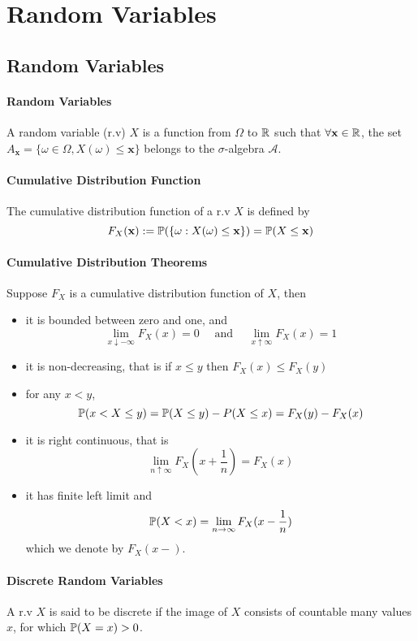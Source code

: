\section{Random Variables}
\subsection{Random Variables}
\paragraph{Random Variables}
A random variable (r.v) \(X\) is a function from \(\Omega\) to \(\mathbb{R}\) such that \(\forall \mathbf{x} \in \mathbb{R}\), the set \(A_{\mathbf{x}} = \{\omega \in \Omega, X(\omega) \leq \mathbf{x}\}\) belongs to the \(\sigma\)-algebra \(\mathcal{A}\).

\paragraph{Cumulative Distribution Function}
The cumulative distribution function of a r.v \(X\) is defined by
\[F_X(\mathbf{x}) := \mathbb{P}(\{\omega: X(\omega) \leq \mathbf{x} \}) = \mathbb{P}(X \leq \mathbf{x})\]

\paragraph{Cumulative Distribution Theorems}
Suppose \(F_X\) is a cumulative distribution function of \(X\), then
\begin{itemize}
    \item it is bounded between zero and one, and 
    \[\lim_{x \downarrow -\infty} F_X(x) = 0 \quad \text{ and } \quad \lim_{x \uparrow \infty} F_X(x) = 1\]
    \item it is non-decreasing, that is if \(x \leq y\) then \(F_X(x) \leq F_X(y)\)
    \item for any \(x < y\),
    \[\mathbb{P}(x < X \leq y) = \mathbb{P}(X \leq y) - P(X \leq x) = F_X(y) - F_X(x)\]
    \item it is right continuous, that is 
    \[\lim_{n \uparrow \infty} F_X(x + \frac{1}{n}) = F_X(x)\]
    \item it has finite left limit and 
    \[\mathbb{P}(X < x) = \lim_{n \to \infty} F_X(x - \frac{1}{n})\]
    which we denote by \(F_X(x-)\).
\end{itemize}

\paragraph{Discrete Random Variables}
A r.v \(X\) is said to be discrete if the image of \(X\) consists of countable many values \(x\), for which \(\mathbb{P}(X = x) > 0\).

